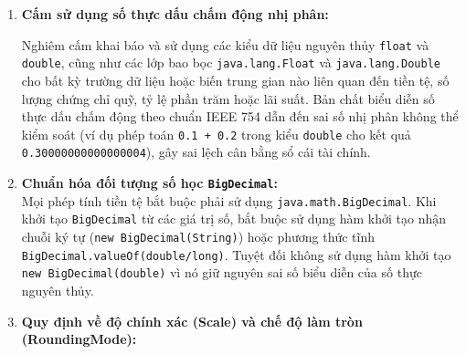 \documentclass[11pt,a4paper]{article}
\begin{document}
\begin{enumerate}
\def\labelenumi{\arabic{enumi}.}
\item
  \textbf{Cấm sử dụng số thực dấu chấm động nhị phân:}\\
  \begin{center}
  \end{center}
  Nghiêm cấm khai báo và sử dụng các kiểu dữ liệu nguyên thủy
  \texttt{float} và \texttt{double}, cũng như các lớp bao bọc
  \texttt{java.lang.Float} và \texttt{java.lang.Double} cho bất kỳ
  trường dữ liệu hoặc biến trung gian nào liên quan đến tiền tệ, số
  lượng chứng chỉ quỹ, tỷ lệ phần trăm hoặc lãi suất. Bản chất biểu diễn
  số thực dấu chấm động theo chuẩn IEEE 754 dẫn đến sai số nhị phân
  không thể kiểm soát (ví dụ phép toán \texttt{0.1\ +\ 0.2} trong kiểu
  \texttt{double} cho kết quả \texttt{0.30000000000000004}), gây sai
  lệch cân bằng sổ cái tài chính.
\item
  \textbf{Chuẩn hóa đối tượng số học \texttt{BigDecimal}:}\\
  Mọi phép tính tiền tệ bắt buộc phải sử dụng
  \texttt{java.math.BigDecimal}. Khi khởi tạo \texttt{BigDecimal} từ các
  giá trị số, bắt buộc sử dụng hàm khởi tạo nhận chuỗi ký tự
  (\texttt{new\ BigDecimal(String)}) hoặc phương thức tĩnh
  \texttt{BigDecimal.valueOf(double/long)}. Tuyệt đối không sử dụng hàm
  khởi tạo \texttt{new\ BigDecimal(double)} vì nó giữ nguyên sai số biểu
  diễn của số thực nguyên thủy.
\item
  \textbf{Quy định về độ chính xác (Scale) và chế độ làm tròn
  (RoundingMode):}


\end{enumerate}
\end{document}
